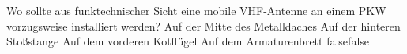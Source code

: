     {Wo sollte aus funktechnischer Sicht eine mobile VHF-Antenne an einem PKW vorzugsweise installiert werden?}
    {Auf der Mitte des Metalldaches}
    {Auf der hinteren Stoßstange}
    {Auf dem vorderen Kotflügel}
    {Auf dem Armaturenbrett}
    {false}{false}